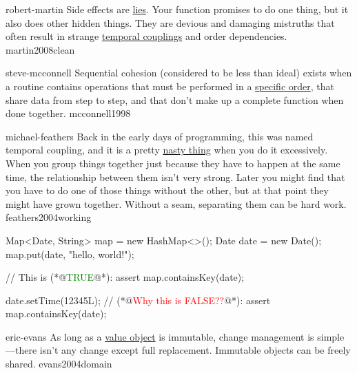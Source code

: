 \documentclass{article}
\begin{document}
\lnQuote
  {robert-martin}
  {Side effects are \ul{lies}. Your function promises to do one thing, but it also does other hidden things. They are devious and damaging mistruths that often result in strange \ul{temporal couplings} and order dependencies.}
  {martin2008clean}

\lnQuote
  {steve-mcconnell}
  {Sequential cohesion (considered to be less than ideal) exists when a routine contains operations that must be performed in a \ul{specific order}, that share data from step to step, and that don't make up a complete function when done together.}
  {mcconnell1998}

\lnQuote
  {michael-feathers}
  {Back in the early days of programming, this was named temporal coupling, and it is a pretty \ul{nasty thing} when you do it excessively. When you group things together just because they have to happen at the same time, the relationship between them isn’t very strong. Later you might find that you have to do one of those things without the other, but at that point they might have grown together. Without a seam, separating them can be hard work.}
  {feathers2004working}

\begin{lnSnippet}
Map<Date, String> map = new HashMap<>();
Date date = new Date();
map.put(date, "hello, world!");

// This is (*@\textcolor{green}{TRUE}@*):
assert map.containsKey(date);

date.setTime(12345L);
// (*@\textcolor{red}{Why this is FALSE??}@*):
assert map.containsKey(date);
\end{lnSnippet}

\lnQuote
  {eric-evans}
  {As long as a \ul{value object} is immutable, change management is simple---there isn't any change except full replacement. Immutable objects can be freely shared.}
  {evans2004domain}


\end{document}
